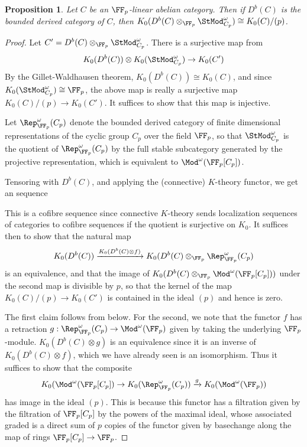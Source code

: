 \documentclass[12pt,oneside]{article}
\newcounter{counter}
\newtheorem{prop}[counter]{Proposition}
\begin{document}
\begin{prop}\label{prop:catmodp}
	Let $C$ be an $\FF_p$-linear abelian category. Then if $D^{b}(C)$ is the bounded derived category of $C$, then $K_0(D^b(C)\otimes_{\FF_p} \StMod^{\omega}_{C_p}) \cong K_0(C)/(p)$.
\end{prop}
\begin{proof}
	Let $C' = D^b(C)\otimes_{\FF_p} \StMod^{\omega}_{C_p}$.
	There is a surjective map from $$K_0(D^b(C)) \otimes  K_0(\StMod^{\omega}_{C_p}) \to K_0(C')$$ By the Gillet-Waldhausen theorem, $K_0(D^b(C)) \cong K_0(C)$, and since $K_0(\StMod^{\omega}_{C_p}) \cong \FF_p$, the above map is really a surjective map $K_0(C)/(p) \to K_0(C')$. It suffices to show that this map is injective.
	
	Let $\Rep^{\omega}_{\FF_p}(C_p)$ denote the bounded derived category of finite dimensional representations of the cyclic group $C_p$ over the field $\FF_p$, so that $\StMod^{\omega}_{C_p}$ is the quotient of $\Rep^{\omega}_{\FF_p}(C_p)$ by the full stable subcategory generated by the projective representation, which is equivalent to $\Mod^{\omega}(\FF_p[C_p])$.
	
	Tensoring with $D^b(C)$, and applying the (connective) $K$-theory functor, we get an sequence
	
	\begin{center}
	\end{center}
	
	This is a cofibre sequence since connective $K$-theory sends localization sequences of categories to cofibre sequences if the quotient is surjective on $K_0$. It suffices then to show that the natural map $$K_0(D^b(C)) \xrightarrow{K_0(D^b(C)\otimes f)} K_0(D^b(C)\otimes_{\FF_p}\Rep^{\omega}_{\FF_p}(C_p)$$ is an equivalence, and that the image of $K_0(D^b(C)\otimes_{\FF_p}\Mod^{\omega}(\FF_p[C_p]))$ under the second map is divisible by $p$, so that the kernel of the map $K_0(C)/(p) \to K_0(C')$ is contained in the ideal $(p)$ and hence is zero.
	
	The first claim follows from  below. For the second, we note that the functor $f$ has a retraction $g:\Rep^{\omega}_{\FF_p}(C_p) \to \Mod^{\omega}(\FF_p)$ given by taking the underlying $\FF_p$-module. $K_0(D^b(C)\otimes g)$ is an equivalence since it is an inverse of $K_0(D^b(C)\otimes f)$, which we have already seen is an isomorphism. Thus it suffices to show that the composite $$K_0(\Mod^{\omega}(\FF_p[C_p]) \to K_0(\Rep^{\omega}_{\FF_p}(C_p)) \xrightarrow{g} K_0(\Mod^{\omega}(\FF_p))$$ has image in the ideal $(p)$. This is because this functor has a filtration given by the filtration of $\FF_p[C_p]$ by the powers of the maximal ideal, whose associated graded is a direct sum of $p$ copies of the functor given by basechange along the map of rings $\FF_p[C_p] \to \FF_p$.
\end{proof}
\end{document}
